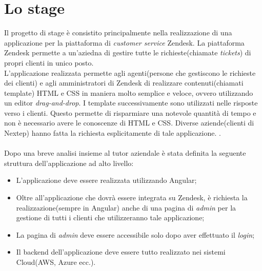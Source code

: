 \section{Lo stage}
Il progetto di stage è consistito principalmente nella realizzazione di una applicazione per la piattaforma di \emph{customer service} Zendesk. La piattaforma Zendesk permette a un'aziedna di gestire tutte le richieste(chiamate \emph{tickets}) di propri clienti in unico posto. \\ L'applicazione realizzata permette agli agenti(persone che gestiscono le richieste dei clienti) e agli amministratori di Zendesk di realizzare contenuti(chiamati template) HTML e CSS in maniera molto semplice e veloce, ovvero utilizzando un editor \emph{drag-and-drop}. I template successivamente sono utilizzati nelle risposte verso i clienti. Questo permette di risparmiare una notevole quantità di tempo e non è necessario avere le conoscenze di HTML e CSS. Diverse aziende(clienti di Nextep) hanno fatta la richiesta esplicitamente di tale applicazione. .
\\
\\
Dopo una breve analisi insieme al tutor aziendale è stata definita la seguente struttura dell'applicazione ad alto livello: 
\begin{itemize}
	\item L'applicazione deve essere realizzata utilizzando Angular; 
	\item Oltre all'applicazione che dovrà essere integrata su Zendesk, è richiesta la realizzazione(sempre in Angular) anche di una pagina di \emph{admin} per la gestione di tutti i clienti che utilizzeranno tale applicazione;
	\item La pagina di \emph{admin} deve essere accessibile solo dopo aver effettuato il \emph{login};
	\item Il backend dell'applicazione deve essere tutto realizzato nei sistemi Cloud(AWS, Azure ecc.).
\end{itemize} 
